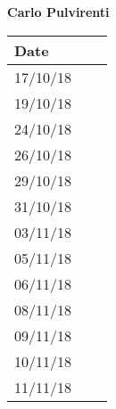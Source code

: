 \documentclass[../main.tex]{subfiles}
\begin{document}
\begin{center}
	{\bf Carlo Pulvirenti}
	\vspace{2mm}

		\begin{tabular}{p{1.3cm}|p{1.8cm}|p{6.7cm}}
			\hline
			\bf Date & \bf \makebox[1.8cm][c]{Hours} & \bf \makebox[6.7cm][c]{Description} \\
			\hline
			17/10/18 & \makebox[1.8cm][c]{2h} & \makebox[6.7cm][c]{Introduction}\\
			19/10/18 & \makebox[1.8cm][c]{3h} & \makebox[6.7cm][c]{Goals, Requirements, Domain assumption}\\
			24/10/18 & \makebox[1.8cm][c]{4h} & \makebox[6.7cm][c]{Goals, Requirements, Domain assumption}\\
			26/10/18 & \makebox[1.8cm][c]{2h} & \makebox[6.7cm][c]{Purpose, Scope}\\
			29/10/18 & \makebox[1.8cm][c]{6h} & \makebox[6.7cm][c]{Use Cases, UML Class Diagram}\\
			31/10/18 & \makebox[1.8cm][c]{5h} & \makebox[6.7cm][c]{Use Cases, UML Class Diagram}\\
			03/11/18 & \makebox[1.8cm][c]{4h} & \makebox[6.7cm][c]{Mockups, Scenarios}\\
			05/11/18 & \makebox[1.8cm][c]{4h} & \makebox[6.7cm][c]{Scenarios, Sequence Diagram}\\
			06/11/18 & \makebox[1.8cm][c]{1h} & \makebox[6.7cm][c]{Mockups, Alloy}\\
			08/11/18 & \makebox[1.8cm][c]{2h} & \makebox[6.7cm][c]{Mockups, Sequence Diagramm, Alloy}\\
			09/11/18 & \makebox[1.8cm][c]{4h} & \makebox[6.7cm][c]{Alloy, Revisioning}\\
			10/11/18 & \makebox[1.8cm][c]{2h} & \makebox[6.7cm][c]{Alloy, Revisioning}\\
			11/11/18 & \makebox[1.8cm][c]{4h} & \makebox[6.7cm][c]{Revisioning}\\
		\end{tabular}
\end{center}

\vspace{1cm}

\newpage
\end{document}
